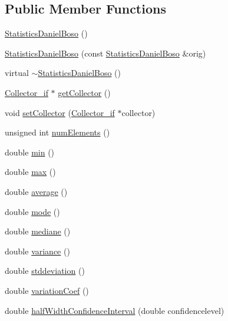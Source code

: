 \subsection*{Public Member Functions}
\begin{DoxyCompactItemize}
\item 
\hyperlink{class_statistics_daniel_boso_a071fe19fe8e4798a3121e80939d16ee3}{Statistics\-Daniel\-Boso} ()
\item 
\hyperlink{class_statistics_daniel_boso_aaa77292969248fccd8054698a98826a1}{Statistics\-Daniel\-Boso} (const \hyperlink{class_statistics_daniel_boso}{Statistics\-Daniel\-Boso} \&orig)
\item 
virtual \hyperlink{class_statistics_daniel_boso_a7258300027b2afb8b04f77319df43f86}{$\sim$\-Statistics\-Daniel\-Boso} ()
\item 
\hyperlink{class_collector__if}{Collector\-\_\-if} $\ast$ \hyperlink{class_statistics_daniel_boso_a00c8fa132a65e7545abea14059521075}{get\-Collector} ()
\item 
void \hyperlink{class_statistics_daniel_boso_a112d28208c76816f8b3ed1bed318f1e4}{set\-Collector} (\hyperlink{class_collector__if}{Collector\-\_\-if} $\ast$collector)
\item 
unsigned int \hyperlink{class_statistics_daniel_boso_a5a5988fd21e4cc41cf4e1ed87c6b7e15}{num\-Elements} ()
\item 
double \hyperlink{class_statistics_daniel_boso_a027ba7feae745623efd1b63352dd4363}{min} ()
\item 
double \hyperlink{class_statistics_daniel_boso_aff2c0e4e5228df0c032b826612cf7af2}{max} ()
\item 
double \hyperlink{class_statistics_daniel_boso_aa9fe6050712928218361095327527ee6}{average} ()
\item 
double \hyperlink{class_statistics_daniel_boso_a7c140b62733f5de4607ae77fa134dc00}{mode} ()
\item 
double \hyperlink{class_statistics_daniel_boso_a2b8c84e1ed1ff68b110dcb1f6fec9047}{mediane} ()
\item 
double \hyperlink{class_statistics_daniel_boso_ac228a5a8a8a866d34d6d8f5e7b9ede15}{variance} ()
\item 
double \hyperlink{class_statistics_daniel_boso_ac7cf2864a85369dad7e2d8f214e98ff7}{stddeviation} ()
\item 
double \hyperlink{class_statistics_daniel_boso_a386746d73807d14c559e1375bd9b48e9}{variation\-Coef} ()
\item 
double \hyperlink{class_statistics_daniel_boso_a1402b5e3abad2247a5ebd3a3797022c2}{half\-Width\-Confidence\-Interval} (double confidencelevel)

\end{DoxyCompactItemize}
